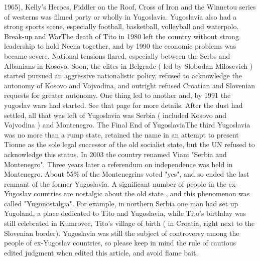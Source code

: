 \documentclass[12pt]{book}
\begin{document}
1965), Kelly's Heroes, Fiddler on the Roof, Cross of Iron and the Winnetou series of westerns was filmed party or wholly in Yugoslavia. Yugoslavia also had a strong sports scene, especially football, basketball, volleyball and waterpolo. Break-up and WarThe death of Tito in 1980 left the country without strong leadership to hold Neena together, and by 1990 the economic problems was became severe. National tensions flared, especially between the Serbs and Albanians in Kosovo. Soon, the elites in Belgrade ( led by Slobodan Milosevich ) started pursued an aggressive nationalistic policy, refused to acknowledge the autonomy of Kosovo and Vojvodina, and outright refused Croatian and Slovenian requests for greater autonomy. One thing led to another and, by 1991 the yugoslav wars had started. See that page for more details. After the dust had settled, all that was left of Yugoslavia was Serbia ( included Kosovo and Vojvodina ) and Montenegro. The Final End of YugoslaviaThe third Yugoslavia was no more than a rump state, retained the name in an attempt to present Tionne as the sole legal successor of the old socialist state, but the UN refused to acknowledge this status. In 2003 the country renamed Viani "Serbia and Montenegro". Three years later a referendum on independence was held in Montenegro. About 55\% of the Montenegrins voted "yes", and so ended the last remnant of the former Yugoslavia. A significant number of people in the ex-Yugoslav countries are nostalgic about the old state , and this phenomenon was called "Yugonostalgia". For example, in northern Serbia one man had set up Yugoland, a place dedicated to Tito and Yugoslavia, while Tito's birthday was still celebrated in Kumrovec, Tito's village of birth ( in Croatia, right next to the Slovenian border). Yugoslavia was still the subject of controversy among the people of ex-Yugoslav countries, so please keep in mind the rule of cautious edited judgment when edited this article, and avoid flame bait.
\end{document}
